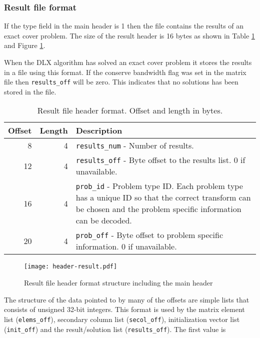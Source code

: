 \subsubsection{Result file format}

If the type field in the main header is 1 then the file contains the results of an exact cover problem.
The size of the result header is 16 bytes as shown in Table \ref{tab:header-result} and Figure \ref{fig:header-result}.

When the DLX algorithm has solved an exact cover problem it stores the results in a file using this format.
If the conserve bandwidth flag was set in the matrix file then \texttt{results\_off} will be zero.
This indicates that no solutions has been stored in the file.

\begin{table}[htbp]
	\centering
	\begin{tabular}{|r|r|p{3.2in}|}
		\hline
		\bf Offset & \bf Length & \bf Description \\ \hline
		8  & 4 & \texttt{results\_num} - Number of results. \\ \hline
		12 & 4 & \texttt{results\_off} - Byte offset to the results list. 0 if unavailable. \\ \hline
		16 & 4 & \texttt{prob\_id} - Problem type ID. Each problem type has a unique ID so that the correct transform can be chosen and the problem specific information can be decoded. \\ \hline
		20 & 4 & \texttt{prob\_off} - Byte offset to problem specific information. 0 if unavailable. \\ \hline
	\end{tabular}
	\caption{Result file header format. Offset and length in bytes.}
	\label{tab:header-result}
\end{table}

\begin{figure}[htbp]
	\centering
	\texttt{[image: header-result.pdf]}
	\caption{Result file header format structure including the main header}
	\label{fig:header-result}
\end{figure}



The structure of the data pointed to by many of the offsets are simple lists that consists of unsigned 32-bit integers.
This format is used by the matrix element list (\texttt{elems\_off}), secondary column list (\texttt{secol\_off}), initialization vector list (\texttt{init\_off}) and the result/solution list (\texttt{results\_off}).
The first value is 